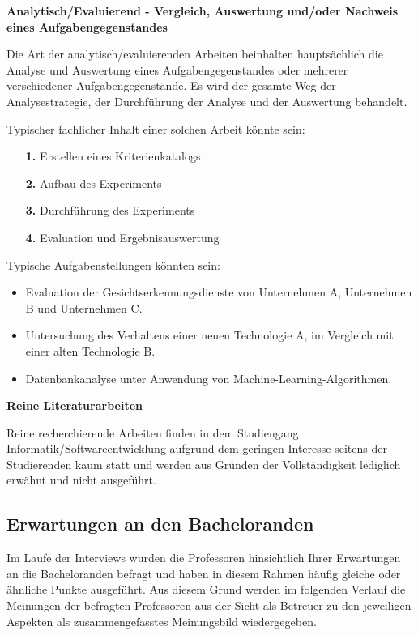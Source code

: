 \documentclass[bibliography=totoc,listof=totoc,BCOR=5mm,DIV=12,oneside]{scrbook}
\begin{document}
\newpage
\par \bigskip \textbf{Analytisch/Evaluierend - Vergleich, Auswertung und/oder Nachweis eines Aufgabengegenstandes}
\par \medskip Die Art der analytisch/evaluierenden Arbeiten beinhalten hauptsächlich die Analyse und Auswertung eines Aufgabengegenstandes oder mehrerer verschiedener Aufgabengegenstände. Es wird der gesamte Weg der Analysestrategie, der Durchführung der Analyse und der Auswertung behandelt.
\par \medskip Typischer fachlicher Inhalt einer solchen Arbeit könnte sein:
\begin{itemize}
\item[\textbf{1.}] Erstellen eines Kriterienkatalogs
\item[\textbf{2.}] Aufbau des Experiments
\item[\textbf{3.}] Durchführung des Experiments
\item[\textbf{4.}] Evaluation und Ergebnisauswertung
\end{itemize}

\par \medskip Typische Aufgabenstellungen könnten sein:
\begin{itemize}
\item Evaluation der Gesichtserkennungsdienste von Unternehmen A, Unternehmen B und Unternehmen C.
\item Untersuchung des Verhaltens einer neuen Technologie A, im Vergleich mit einer alten Technologie B.
\item Datenbankanalyse unter Anwendung von Machine-Learning-Algorithmen.
\end{itemize}

\par \bigskip \textbf{Reine Literaturarbeiten}
\par Reine recherchierende Arbeiten finden in dem Studiengang Informatik/Softwareentwicklung aufgrund dem geringen Interesse seitens der Studierenden kaum statt und werden aus Gründen der Vollständigkeit lediglich erwähnt und nicht ausgeführt.

\newpage
\subsection{Erwartungen an den Bacheloranden}
\par Im Laufe der Interviews wurden die Professoren hinsichtlich Ihrer Erwartungen an die Bacheloranden befragt und haben in diesem Rahmen häufig gleiche oder ähnliche Punkte ausgeführt. Aus diesem Grund werden im folgenden Verlauf die Meinungen der befragten Professoren aus der Sicht als Betreuer zu den jeweiligen Aspekten als zusammengefasstes Meinungsbild wiedergegeben.
\end{document}
